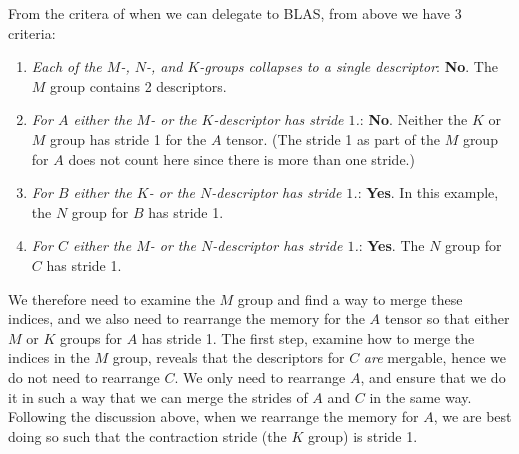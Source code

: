 \documentclass[11pt]{article}
\begin{document}
From the critera of when we can delegate to BLAS, from above we have 3 criteria:
\begin{enumerate}
  \item \textit{Each of the $M$-, $N$-, and $K$-groups collapses to a single descriptor}: \textbf{No}. The $M$
        group contains 2 descriptors.
  \item \textit{For $A$ either the $M$- or the $K$-descriptor has stride $1$.}: \textbf{No}. Neither the $K$ or $M$ group
        has stride 1 for the $A$ tensor. (The stride 1 as part of the $M$ group for $A$ does not count here since there is more than one stride.)
  \item \textit{For $B$ either the $K$- or the $N$-descriptor has stride $1$.}: \textbf{Yes}. In this example, the $N$ group for $B$ has stride 1.
  \item \textit{For $C$ either the $M$- or the $N$-descriptor has stride $1$.}: \textbf{Yes}. The $N$ group for $C$ has stride 1.
\end{enumerate}

We therefore need to examine the $M$ group and find a way to merge these indices, and we also need to rearrange the memory for the
$A$ tensor so that either $M$ or $K$ groups for $A$ has stride 1. The first step, examine how to merge the indices in the $M$ group,
reveals that the descriptors for $C$ \emph{are} mergable, hence we do not need to rearrange $C$. We only need to rearrange $A$, and
ensure that we do it in such a way that we can merge the strides of $A$ and $C$ in the same way. Following the discussion above,
when we rearrange the memory for $A$, we are best doing so such that the contraction stride (the $K$ group) is stride 1.
\end{document}
